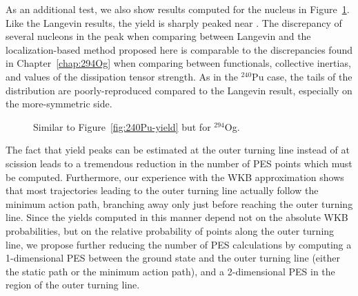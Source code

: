 As an additional test, we also show results computed for the nucleus {\Og} in Figure~\ref{fig:294Og-frags}. Like the Langevin results, the yield is sharply peaked near {\Pb}. The discrepancy of several nucleons in the peak when comparing between Langevin and the localization-based method proposed here is comparable to the discrepancies found in Chapter~\ref{chap:294Og} when comparing between functionals, collective inertias, and values of the dissipation tensor strength. As in the $^{240}$Pu case, the tails of the distribution are poorly-reproduced compared to the Langevin result, especially on the more-symmetric side.

\begin{figure}%
	\centering
	\qquad
	\caption{Similar to Figure~\ref{fig:240Pu-yield} but for $^{294}$Og.}%
	\label{fig:294Og-frags}%
\end{figure}

The fact that yield peaks can be estimated at the outer turning line instead of at scission leads to a tremendous reduction in the number of PES points which must be computed. Furthermore, our experience with the WKB approximation shows that most trajectories leading to the outer turning line actually follow the minimum action path, branching away only just before reaching the outer turning line. Since the yields computed in this manner depend not on the absolute WKB probabilities, but on the relative probability of points along the outer turning line, we propose further reducing the number of PES calculations by computing a 1-dimensional PES between the ground state and the outer turning line (either the static path or the minimum action path), and a 2-dimensional PES in the region of the outer turning line.


